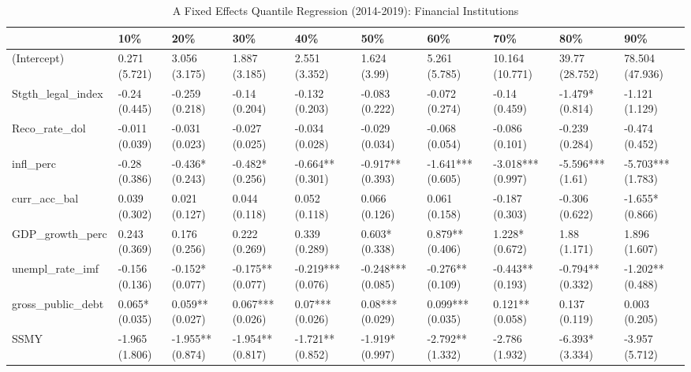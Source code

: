 \begin{table}[ht]
\centering
\caption{A Fixed Effects Quantile Regression (2014-2019): Financial Institutions} 
\begingroup\small
\begin{tabular}{llllllllll}
  \toprule
 & 10\% & 20\% & 30\% & 40\% & 50\% & 60\% & 70\% & 80\% & 90\% \\ 
  \midrule
(Intercept) & 0.271 (5.721) & 3.056 (3.175) & 1.887 (3.185) & 2.551 (3.352) & 1.624 (3.99) & 5.261 (5.785) & 10.164 (10.771) & 39.77 (28.752) & 78.504 (47.936) \\ 
  Stgth\_legal\_index & -0.24 (0.445) & -0.259 (0.218) & -0.14 (0.204) & -0.132 (0.203) & -0.083 (0.222) & -0.072 (0.274) & -0.14 (0.459) & -1.479* (0.814) & -1.121 (1.129) \\ 
  Reco\_rate\_dol & -0.011 (0.039) & -0.031 (0.023) & -0.027 (0.025) & -0.034 (0.028) & -0.029 (0.034) & -0.068 (0.054) & -0.086 (0.101) & -0.239 (0.284) & -0.474 (0.452) \\ 
  infl\_perc & -0.28 (0.386) & -0.436* (0.243) & -0.482* (0.256) & -0.664** (0.301) & -0.917** (0.393) & -1.641*** (0.605) & -3.018*** (0.997) & -5.596*** (1.61) & -5.703*** (1.783) \\ 
  curr\_acc\_bal & 0.039 (0.302) & 0.021 (0.127) & 0.044 (0.118) & 0.052 (0.118) & 0.066 (0.126) & 0.061 (0.158) & -0.187 (0.303) & -0.306 (0.622) & -1.655* (0.866) \\ 
  GDP\_growth\_perc & 0.243 (0.369) & 0.176 (0.256) & 0.222 (0.269) & 0.339 (0.289) & 0.603* (0.338) & 0.879** (0.406) & 1.228* (0.672) & 1.88 (1.171) & 1.896 (1.607) \\ 
  unempl\_rate\_imf & -0.156 (0.136) & -0.152* (0.077) & -0.175** (0.077) & -0.219*** (0.076) & -0.248*** (0.085) & -0.276** (0.109) & -0.443** (0.193) & -0.794** (0.332) & -1.202** (0.488) \\ 
  gross\_public\_debt & 0.065* (0.035) & 0.059** (0.027) & 0.067*** (0.026) & 0.07*** (0.026) & 0.08*** (0.029) & 0.099*** (0.035) & 0.121** (0.058) & 0.137 (0.119) & 0.003 (0.205) \\ 
  SSMY & -1.965 (1.806) & -1.955** (0.874) & -1.954** (0.817) & -1.721** (0.852) & -1.919* (0.997) & -2.792** (1.332) & -2.786 (1.932) & -6.393* (3.334) & -3.957 (5.712) \\ 
   \bottomrule
\end{tabular}
\endgroup
\end{table}
